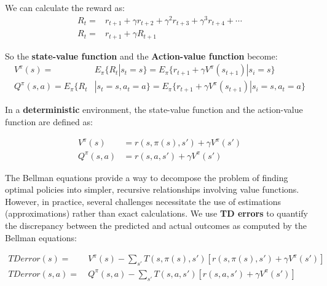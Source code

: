 We can calculate the reward as: 
\begin{equation}
\begin{aligned}
     R_t = &  r_{t+1} + \gamma r_{t+2} + \gamma ^{2} r_{t+3} + \gamma ^{3} r_{t+4} + \cdots
     \\     R_t = & r_{t+1} + \gamma R_{t+1}
\end{aligned}
\end{equation}
\vspace*{0.1cm}

So the \textbf{state-value function} and the \textbf{Action-value function} become: 
\begin{equation}
\begin{aligned}
        V^{\pi} (s) = & E_{\pi} \{ R_t | s_t = s \} = E_{\pi} \{ r_{t+1} + \gamma V^{\pi} (s_{t+1}) | s_i = s \} 
        \\     Q^{\pi} (s,a) = E_{\pi} \{ R_t & | s_t = s, a_t=a \} = E_{\pi} \{ r_{t+1} + \gamma V^{\pi} (s_{t+1}) | s_i = s, a_t=a \}
\end{aligned}
\end{equation}
\vspace*{0.1cm}

In a \textbf{deterministic} environment, the state-value function and the action-value function are defined as: 

\begin{equation}
\begin{aligned}
        V^{\pi} (s) & =  r(s, \pi (s) , s') + \gamma V^{\pi} (s')
  \\           Q^{\pi} (s,a) & =  r(s, a , s') + \gamma V^{\pi} (s')
\end{aligned}
\end{equation}


The Bellman equations provide a way to decompose the problem of finding optimal policies into simpler, recursive relationships involving value functions. However, in practice, several challenges necessitate the use of estimations (approximations) rather than exact calculations. We use \textbf{TD errors }to quantify the discrepancy between the predicted and actual outcomes as computed by the Bellman equations:

\begin{equation}
    \begin{aligned}
        TDerror(s) = & \ V^{\pi} (s) - \sum _{s'} T(s, \pi (s) , s') [ r(s, \pi (s) , s') + \gamma V^{\pi} (s')]
        \\
        TDerror(s,a) = & \ Q^{\pi} (s,a) - \sum _{s'} T(s, a , s') [ r(s, a , s') + \gamma V^{\pi} (s')]
    \end{aligned}
\end{equation}

